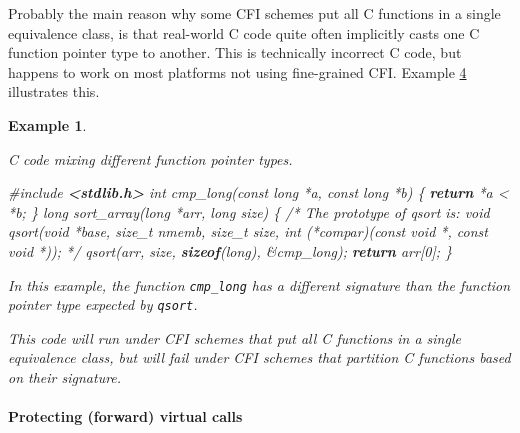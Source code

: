 \documentclass[
  a4paper,
]{report}
\newtheorem{example}{Example}
\newenvironment{Shaded}{}{}
\newcommand{\CommentTok}[1]{\textcolor[rgb]{0.38,0.63,0.69}{\textit{#1}}}
\newcommand{\ControlFlowTok}[1]{\textcolor[rgb]{0.00,0.44,0.13}{\textbf{#1}}}
\newcommand{\DataTypeTok}[1]{\textcolor[rgb]{0.56,0.13,0.00}{#1}}
\newcommand{\DecValTok}[1]{\textcolor[rgb]{0.25,0.63,0.44}{#1}}
\newcommand{\ImportTok}[1]{\textcolor[rgb]{0.00,0.50,0.00}{\textbf{#1}}}
\newcommand{\KeywordTok}[1]{\textcolor[rgb]{0.00,0.44,0.13}{\textbf{#1}}}
\newcommand{\NormalTok}[1]{#1}
\newcommand{\OperatorTok}[1]{\textcolor[rgb]{0.40,0.40,0.40}{#1}}
\newcommand{\PreprocessorTok}[1]{\textcolor[rgb]{0.74,0.48,0.00}{#1}}
\begin{document}
Probably the main reason why some CFI schemes put all C functions in a
single equivalence class, is that real-world C code quite often
implicitly casts one C function pointer type to another. This is
technically incorrect C code, but happens to work on most platforms not
using fine-grained CFI. Example \hyperref[ex:qsort-cfi]{4} illustrates
this.

\label{ex:qsort-cfi}
\begin{example}

\label{ex:qsort-cfi}

\textup{C code mixing different function pointer types.}

\begin{Shaded}
\begin{Highlighting}[]
\PreprocessorTok{\#include }\ImportTok{\textless{}stdlib.h\textgreater{}}
\DataTypeTok{int}\NormalTok{ cmp\_long}\OperatorTok{(}\DataTypeTok{const} \DataTypeTok{long} \OperatorTok{*}\NormalTok{a}\OperatorTok{,} \DataTypeTok{const} \DataTypeTok{long} \OperatorTok{*}\NormalTok{b}\OperatorTok{)} \OperatorTok{\{} \ControlFlowTok{return} \OperatorTok{*}\NormalTok{a }\OperatorTok{\textless{}} \OperatorTok{*}\NormalTok{b}\OperatorTok{;} \OperatorTok{\}}
\DataTypeTok{long}\NormalTok{ sort\_array}\OperatorTok{(}\DataTypeTok{long} \OperatorTok{*}\NormalTok{arr}\OperatorTok{,} \DataTypeTok{long}\NormalTok{ size}\OperatorTok{)} \OperatorTok{\{}
  \CommentTok{/* The prototype of qsort is:}
\CommentTok{     void qsort(void *base, size\_t nmemb, size\_t size,}
\CommentTok{                int (*compar)(const void *, const void *)); */}
\NormalTok{  qsort}\OperatorTok{(}\NormalTok{arr}\OperatorTok{,}\NormalTok{ size}\OperatorTok{,} \KeywordTok{sizeof}\OperatorTok{(}\DataTypeTok{long}\OperatorTok{),} \OperatorTok{\&}\NormalTok{cmp\_long}\OperatorTok{);}
  \ControlFlowTok{return}\NormalTok{ arr}\OperatorTok{[}\DecValTok{0}\OperatorTok{];}
\OperatorTok{\}}
\end{Highlighting}
\end{Shaded}

In this example, the function \texttt{cmp\_long} has a different
signature than the function pointer type expected by \texttt{qsort}.

This code will run under CFI schemes that put all C functions in a
single equivalence class, but will fail under CFI schemes that partition
C functions based on their signature.

\end{example}

\paragraph{Protecting (forward) virtual
calls}\label{protecting-forward-virtual-calls}
\end{document}
